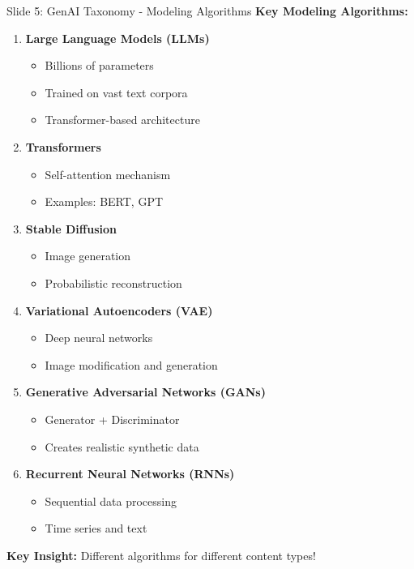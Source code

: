 \documentclass[8pt]{beamer}
\begin{document}
	\begin{frame}{Slide 5: GenAI Taxonomy - Modeling Algorithms}
		\fontsize{6.5}{7.5}\selectfont
		\textbf{Key Modeling Algorithms:}
		\begin{enumerate}
			\item \textbf{Large Language Models (LLMs)}
			\begin{itemize}
				\item Billions of parameters
				\item Trained on vast text corpora
				\item Transformer-based architecture
			\end{itemize}
			\item \textbf{Transformers}
			\begin{itemize}
				\item Self-attention mechanism
				\item Examples: BERT, GPT
			\end{itemize}
			\item \textbf{Stable Diffusion}
			\begin{itemize}
				\item Image generation
				\item Probabilistic reconstruction
			\end{itemize}
			\item \textbf{Variational Autoencoders (VAE)}
			\begin{itemize}
				\item Deep neural networks
				\item Image modification and generation
			\end{itemize}
			\item \textbf{Generative Adversarial Networks (GANs)}
			\begin{itemize}
				\item Generator + Discriminator
				\item Creates realistic synthetic data
			\end{itemize}
			\item \textbf{Recurrent Neural Networks (RNNs)}
			\begin{itemize}
				\item Sequential data processing
				\item Time series and text
			\end{itemize}
		\end{enumerate}
		
		\textcolor{myblue}{\textbf{Key Insight:}} Different algorithms for different content types!
	\end{frame}
	
\end{document}
